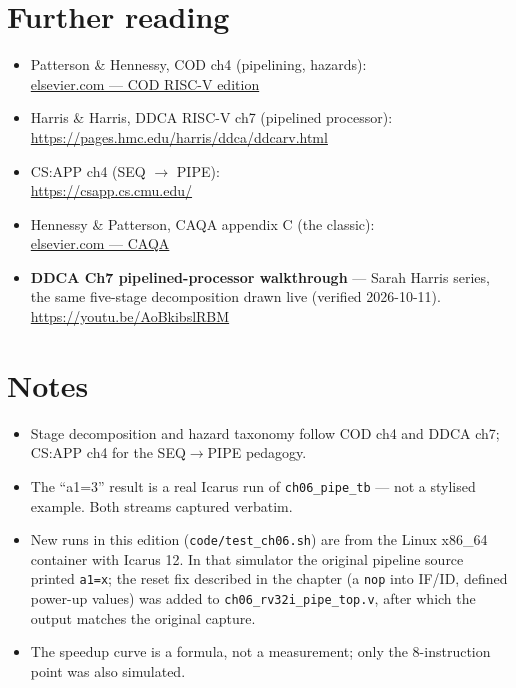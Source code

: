 \section*{Further reading}
\label{sec:further06}
\begin{itemize}
\item Patterson \& Hennessy, COD ch4 (pipelining, hazards):\\
      \href{https://www.elsevier.com/books/computer-organization-and-design-risc-v-edition/patterson/978-0-12-820331-6}{elsevier.com --- COD RISC-V edition}
\item Harris \& Harris, DDCA RISC-V ch7 (pipelined processor):\\
      \url{https://pages.hmc.edu/harris/ddca/ddcarv.html}
\item CS:APP ch4 (SEQ $\to$ PIPE):\\
      \url{https://csapp.cs.cmu.edu/}
\item Hennessy \& Patterson, CAQA appendix C (the classic):\\
      \href{https://www.elsevier.com/books/computer-architecture/hennessy/978-0-12-811905-1}{elsevier.com --- CAQA}
\end{itemize}

\begin{rulebox}
\begin{itemize}
\item \textbf{DDCA Ch7 pipelined-processor walkthrough} --- Sarah
      Harris series, the same five-stage decomposition drawn live
      (verified 2026-10-11). \url{https://youtu.be/AoBkibslRBM}
\end{itemize}
\end{rulebox}

\section*{Notes}
\label{sec:notes06}
\begin{itemize}
\item Stage decomposition and hazard taxonomy follow COD ch4 and
      DDCA ch7; CS:APP ch4 for the SEQ$\to$PIPE pedagogy.
\item The ``a1=3'' result is a real Icarus run of
      \texttt{ch06\_pipe\_tb} --- not a stylised example. Both
      streams captured verbatim.
\item New runs in this edition (\texttt{code/test\_ch06.sh}) are
      from the Linux x86\_64 container with Icarus 12. In that
      simulator the original pipeline source printed \texttt{a1=x};
      the reset fix described in the chapter (a \texttt{nop} into
      IF/ID, defined power-up values) was added to
      \texttt{ch06\_rv32i\_pipe\_top.v}, after which the output
      matches the original capture.
\item The speedup curve is a formula, not a measurement; only the
      8-instruction point was also simulated.
\end{itemize}

